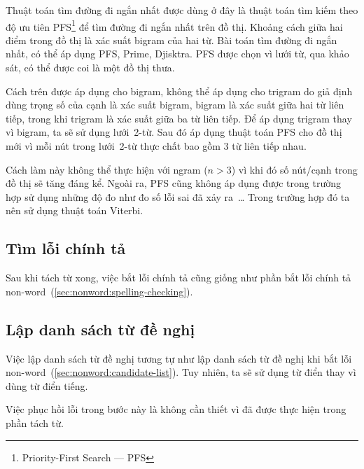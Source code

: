 \documentclass[a4paper,oneside,14pt]{extbook} %
\begin{document}
Thuật toán tìm đường đi ngắn nhất được dùng ở đây là thuật toán tìm
kiếm theo độ ưu tiên PFS\footnote{Priority-First Search --- PFS} để tìm
đường đi ngắn nhất trên đồ thị. Khoảng cách giữa hai 
điểm trong đồ thị là xác suất bi\-gram của hai từ. Bài toán tìm đường
đi ngắn nhất, có thể áp dụng PFS, Prime, Djisktra. PFS được chọn vì
lưới từ, qua khảo sát, có thể được coi là một đồ thị thưa.

Cách trên được áp dụng cho bi\-gram, không thể áp dụng cho tri\-gram do
giả định dùng trọng số của cạnh là xác suất bi\-gram, bi\-gram là xác suất
giữa hai từ liên tiếp, trong khi tri\-gram là xác suất giữa ba từ liên
tiếp. Để áp dụng tri\-gram thay vì bi\-gram, ta sẽ sử dụng lưới~2-từ. Sau
đó áp dụng thuật toán PFS cho đồ thị mới vì mỗi nút trong lưới~2-từ
thực chất bao gồm 3 từ liên tiếp nhau.

Cách làm này không thể thực hiện với n\-gram ($n > 3$) vì khi đó số
nút/cạnh trong đồ thị sẽ tăng đáng kể. Ngoài ra, PFS cũng không áp
dụng được trong trường hợp sử dụng những độ đo như đo số lỗi sai đã
xảy ra~\ldots{} Trong trường hợp đó ta nên sử dụng thuật toán
Viterbi.


\subsection{Tìm lỗi chính tả}
\label{sec:realword:spelling-checking}

Sau khi tách từ xong, việc bắt lỗi chính tả cũng giống như phần bắt
lỗi chính tả non-word~(\ref{sec:nonword:spelling-checking}).

\subsection{Lập danh sách từ đề nghị}
\label{sec:realword:candidate-list}

Việc lập danh sách từ đề nghị tương tự như lập danh sách từ đề nghị
khi bắt lỗi non-word~(\ref{sec:nonword:candidate-list}). Tuy nhiên, ta
sẽ sử dụng từ điển thay vì dùng từ điển tiếng.

Việc phục hồi lỗi trong bước này là không cần thiết vì đã được thực
hiện trong phần tách từ.

\end{document}
